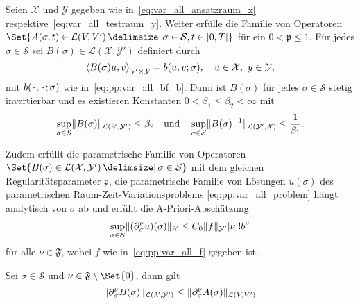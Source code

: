 \begin{Satz}
\label{thm:kunoth:theorem21}
    Seien $\mathcal X$ und $\mathcal Y$ gegeben wie in~\eqref{eq:var_all_ansatzraum_x} respektive~\eqref{eq:var_all_testraum_y}.
    Weiter erfülle die Familie von Operatoren $\Set{ A(\sigma, t) \in \mathcal L(V, V') \given \sigma \in \mathcal S, t \in [0, T] }$  für ein $0 < \mathfrak p \leq 1$.
    Für jedes $\sigma \in \mathcal S$ sei $B(\sigma) \in \mathcal L(\mathcal X, \mathcal Y')$ definiert durch
    \begin{equation}
        \label{eq:var_all_gross_b_parametrisch}
        \left\langle B(\sigma) u,v\right\rangle_{\mathcal Y' \times \mathcal Y} = b(u, v; \sigma), \quad u \in \mathcal X,~y \in \mathcal Y,
    \end{equation}
    mit $b({\mkern2mu\cdot\mkern2mu}, {\mkern2mu\cdot\mkern2mu}; \sigma)$ wie in~\eqref{eq:pp:var_all_bf_b}.
    Dann ist $B(\sigma)$ für jedes $\sigma \in \mathcal S$ stetig invertierbar und es existieren Konstanten $0 < \beta_{1} \leq \beta_{2} < \infty$ mit
    \begin{equation}
        \label{eq:var_all_norm_B_und_B_inv_parametrisch}
        \sup_{\sigma \in \mathcal S} \lVert B(\sigma)\rVert_{\mathcal L(\mathcal X, \mathcal Y')} \leq \beta_{2} \quad \text{und} \quad  \sup_{\sigma \in \mathcal S} \lVert B(\sigma)^{-1}\rVert_{\mathcal L(\mathcal Y', \mathcal X)} \leq \frac{1}{\beta_{1}}.
    \end{equation}

    Zudem erfüllt die parametrische Familie von Operatoren $\Set{ B(\sigma) \in \mathcal L(\mathcal X, \mathcal Y') \given \sigma \in \mathcal S }$  mit dem gleichen Regularitätsparameter $\mathfrak p$, die parametrische Familie von Lösungen $u(\sigma)$ des parametrischen Raum-Zeit-Variationsproblems \eqref{eq:pp:var_all_problem} hängt analytisch von $\sigma$ ab und erfüllt die A-Priori-Abschätzung
    \begin{equation}
        \label{eq:var_all_a_priori_schranke}
        \sup_{\sigma \in \mathcal S} \lVert(\partial^{\nu}_{\sigma} u)(\sigma)\rVert_{\mathcal X} \leq C_{0} \lVert f\rVert_{\mathcal Y'} \lvert\nu\rvert! \tilde{b}^{\nu}
    \end{equation}
    für alle $\nu \in \mathfrak F$, wobei $f$ wie in~\eqref{eq:pp:var_all_f} gegeben ist.
\end{Satz}

\begin{Lemma}
\label{lemma:norm_B_beschraenkt_durch_norm_A}
    Sei $\sigma \in \mathcal S$ und $\nu \in \mathfrak F \setminus \Set{ 0 }$, dann gilt
    \begin{equation}
        \lVert\partial^{\nu}_{\sigma} B(\sigma)\rVert_{\mathcal L(\mathcal X, \mathcal Y')}
        \leq
        \lVert\partial^{\nu}_{\sigma} A(\sigma)\rVert_{\mathcal L(V, V')}
    \end{equation}

    \begin{Beweis}
    \end{Beweis}
\end{Lemma}

